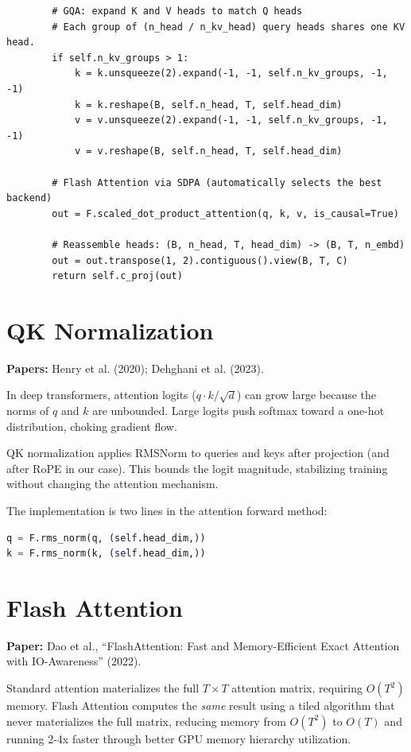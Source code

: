 \begin{lstlisting}
        # GQA: expand K and V heads to match Q heads
        # Each group of (n_head / n_kv_head) query heads shares one KV head.
        if self.n_kv_groups > 1:
            k = k.unsqueeze(2).expand(-1, -1, self.n_kv_groups, -1, -1)
            k = k.reshape(B, self.n_head, T, self.head_dim)
            v = v.unsqueeze(2).expand(-1, -1, self.n_kv_groups, -1, -1)
            v = v.reshape(B, self.n_head, T, self.head_dim)

        # Flash Attention via SDPA (automatically selects the best backend)
        out = F.scaled_dot_product_attention(q, k, v, is_causal=True)

        # Reassemble heads: (B, n_head, T, head_dim) -> (B, T, n_embd)
        out = out.transpose(1, 2).contiguous().view(B, T, C)
        return self.c_proj(out)
\end{lstlisting}


\section{QK Normalization}

\textbf{Papers:} Henry et al. (2020); Dehghani et al. (2023).

In deep transformers, attention logits ($q \cdot k / \sqrt{d}$) can grow large because the norms of $q$ and $k$ are unbounded.  Large logits push softmax toward a one-hot distribution, choking gradient flow.

QK normalization applies RMSNorm to queries and keys after projection (and after RoPE in our case).  This bounds the logit magnitude, stabilizing training without changing the attention mechanism.

The implementation is two lines in the attention forward method:
\begin{lstlisting}[language=Python]
q = F.rms_norm(q, (self.head_dim,))
k = F.rms_norm(k, (self.head_dim,))
\end{lstlisting}


\section{Flash Attention}

\textbf{Paper:} Dao et al., ``FlashAttention: Fast and Memory-Efficient Exact Attention with IO-Awareness'' (2022).

Standard attention materializes the full $T \times T$ attention matrix, requiring $O(T^2)$ memory.  Flash Attention computes the \emph{same} result using a tiled algorithm that never materializes the full matrix, reducing memory from $O(T^2)$ to $O(T)$ and running 2-4x faster through better GPU memory hierarchy utilization.

